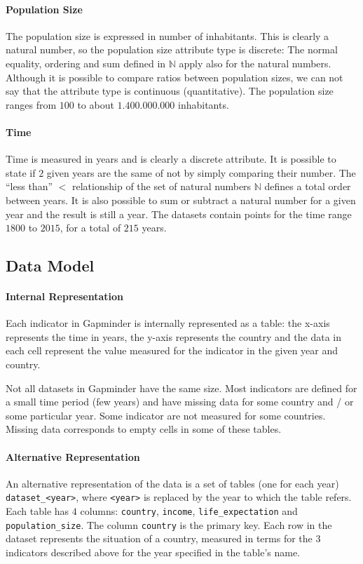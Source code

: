 \paragraph{Population Size}
The population size is expressed in number of inhabitants.
This is clearly a natural number, so the population size attribute type is discrete:
The normal equality, ordering and sum defined in $\mathbb{N}$ apply also for the natural numbers.
Although it is possible to compare ratios between population sizes, we can not say that the attribute type is continuous (quantitative). 
The population size ranges from $100$ to about $1.400.000.000$ inhabitants.

\paragraph{Time}
Time is measured in years and is clearly a discrete attribute.
It is possible to state if $2$ given years are the same of not by simply comparing their number.
The ``less than'' $<$ relationship of the set of natural numbers $\mathbb{N}$ defines a total order between years.
It is also possible to sum or subtract a natural number for a given year and the result is still a year.
The datasets contain points for the time range $1800$ to $2015$, for a total of $215$ years.


\subsection{Data Model}

\paragraph{Internal Representation}
Each indicator in Gapminder is internally represented as a table:
the x-axis represents the time in years, the y-axis represents the country and the data in each cell represent the value measured for the indicator in the given year and country.

Not all datasets in Gapminder have the same size.
Most indicators are defined for a small time period (few years) and have missing data for some country and / or some particular year.
Some indicator are not measured for some countries.
Missing data corresponds to empty cells in some of these tables.

\paragraph{Alternative Representation}
An alternative representation of the data is a set of tables (one for each year) \texttt{dataset\_<year>}, where \texttt{<year>} is replaced by the year to which the table refers.
Each table has $4$ columns: \texttt{country}, \texttt{income}, \texttt{life\_expectation} and \texttt{population\_size}.
The column \texttt{country} is the primary key.
Each row in the dataset represents the situation of a country, measured in terms for the $3$ indicators described above for the year specified in the table's name.

